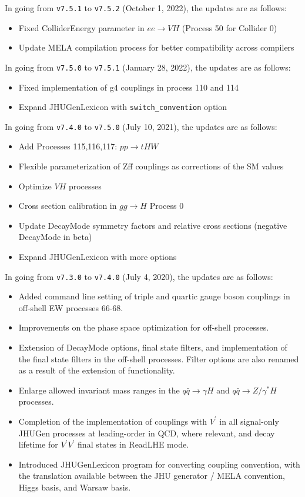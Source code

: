 \documentclass[aps,superscriptaddress,nofootinbib]{revtex4}
\begin{document}
\noindent 
In going from \verb|v7.5.1| to \verb|v7.5.2| (October 1, 2022), the updates are as follows:
\noindent
\begin{itemize}
\item Fixed ColliderEnergy parameter in $ee\to VH$ (Process 50 for Collider 0)
\item Update MELA compilation process for better compatibility across compilers
\end{itemize}
In going from \verb|v7.5.0| to \verb|v7.5.1| (January 28, 2022), the updates are as follows:
\noindent
\begin{itemize}
\item Fixed implementation of g4 couplings in process 110 and 114 
\item Expand JHUGenLexicon with \verb|switch_convention| option
\end{itemize}
In going from \verb|v7.4.0| to \verb|v7.5.0| (July 10, 2021), the updates are as follows:
\begin{itemize}
\item Add Processes 115,116,117: $pp\to tHW$
\item Flexible parameterization of Zff couplings as corrections of the SM values 
\item Optimize $VH$ processes 
\item Cross section calibration in $gg\to H$ Process 0
\item Update DecayMode symmetry factors and relative cross sections (negative DecayMode in beta)
\item Expand JHUGenLexicon with more options 
\end{itemize}
\noindent
In going from \verb|v7.3.0| to \verb|v7.4.0| (July 4, 2020), the updates are as follows:
\begin{itemize}
\item Added command line setting of triple and quartic gauge boson couplings in off-shell EW processes 66-68.
\item Improvements on the phase space optimization for off-shell processes.
\item Extension of DecayMode options, final state filters, and implementation of the final state filters in the off-shell processes. Filter options are also renamed as a result of the extension of functionality.
\item Enlarge allowed invariant mass ranges in the $q\bar{q} \to \gamma H$ and $q\bar{q} \to Z/\gamma^* H$ processes.
\item Completion of the implementation of couplings with $V^\prime$ in all signal-only JHUGen processes at leading-order in QCD, where relevant, and decay lifetime for $V^\prime V^\prime$ final states in ReadLHE mode.
\item Introduced JHUGenLexicon program for converting coupling convention, 
with the translation available between the JHU generator / MELA convention, Higgs basis, and Warsaw basis. 
\end{itemize}
\end{document}
